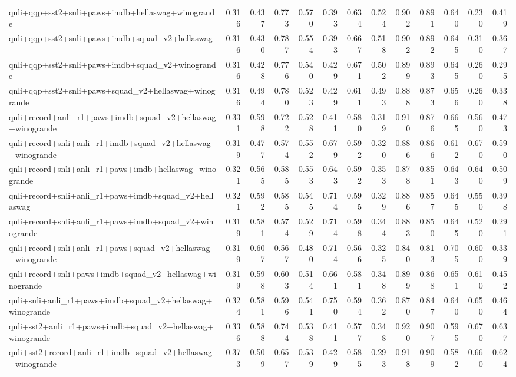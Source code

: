 \begin{table}[t]
\begin{tabular}{lrrrrrrrrrrrr}
    qnli+qqp+sst2+snli+paws+imdb+hellaswag+winogrande & 0.316 & 0.437 & 0.773 & 0.570 & 0.393 & 0.634 & 0.524 & 0.902 & 0.891 & 0.640 & 0.230 & 0.419 \\
    qnli+qqp+sst2+snli+paws+imdb+squad\_v2+hellaswag & 0.316 & 0.430 & 0.787 & 0.554 & 0.393 & 0.667 & 0.518 & 0.902 & 0.892 & 0.645 & 0.310 & 0.367 \\
    qnli+qqp+sst2+snli+paws+imdb+squad\_v2+winogrande & 0.316 & 0.428 & 0.776 & 0.540 & 0.429 & 0.671 & 0.502 & 0.899 & 0.893 & 0.645 & 0.260 & 0.295 \\
    qnli+qqp+sst2+snli+paws+squad\_v2+hellaswag+winogrande & 0.316 & 0.494 & 0.780 & 0.523 & 0.429 & 0.611 & 0.493 & 0.888 & 0.873 & 0.656 & 0.260 & 0.338 \\
    qnli+record+anli\_r1+paws+imdb+squad\_v2+hellaswag+winogrande & 0.331 & 0.598 & 0.722 & 0.528 & 0.411 & 0.580 & 0.319 & 0.910 & 0.876 & 0.665 & 0.560 & 0.473 \\
    qnli+record+snli+anli\_r1+imdb+squad\_v2+hellaswag+winogrande & 0.319 & 0.477 & 0.574 & 0.552 & 0.679 & 0.592 & 0.320 & 0.886 & 0.866 & 0.612 & 0.670 & 0.590 \\
    qnli+record+snli+anli\_r1+paws+imdb+hellaswag+winogrande & 0.321 & 0.565 & 0.585 & 0.553 & 0.643 & 0.592 & 0.353 & 0.878 & 0.851 & 0.643 & 0.640 & 0.509 \\
    qnli+record+snli+anli\_r1+paws+imdb+squad\_v2+hellaswag & 0.321 & 0.592 & 0.585 & 0.545 & 0.714 & 0.595 & 0.329 & 0.886 & 0.857 & 0.645 & 0.550 & 0.398 \\
    qnli+record+snli+anli\_r1+paws+imdb+squad\_v2+winogrande & 0.319 & 0.581 & 0.574 & 0.529 & 0.714 & 0.598 & 0.344 & 0.883 & 0.850 & 0.645 & 0.520 & 0.291 \\
    qnli+record+snli+anli\_r1+paws+squad\_v2+hellaswag+winogrande & 0.319 & 0.607 & 0.567 & 0.480 & 0.714 & 0.566 & 0.325 & 0.840 & 0.813 & 0.705 & 0.600 & 0.339 \\
    qnli+record+snli+paws+imdb+squad\_v2+hellaswag+winogrande & 0.319 & 0.598 & 0.603 & 0.514 & 0.661 & 0.581 & 0.348 & 0.899 & 0.868 & 0.651 & 0.610 & 0.452 \\
    qnli+snli+anli\_r1+paws+imdb+squad\_v2+hellaswag+winogrande & 0.324 & 0.581 & 0.596 & 0.541 & 0.750 & 0.594 & 0.362 & 0.870 & 0.847 & 0.640 & 0.650 & 0.464 \\
    qnli+sst2+anli\_r1+paws+imdb+squad\_v2+hellaswag+winogrande & 0.336 & 0.588 & 0.744 & 0.538 & 0.411 & 0.577 & 0.348 & 0.920 & 0.907 & 0.595 & 0.670 & 0.637 \\
    qnli+sst2+record+anli\_r1+imdb+squad\_v2+hellaswag+winogrande & 0.373 & 0.509 & 0.657 & 0.539 & 0.429 & 0.585 & 0.293 & 0.918 & 0.909 & 0.582 & 0.660 & 0.624 \\

\end{tabular}
\end{table}
